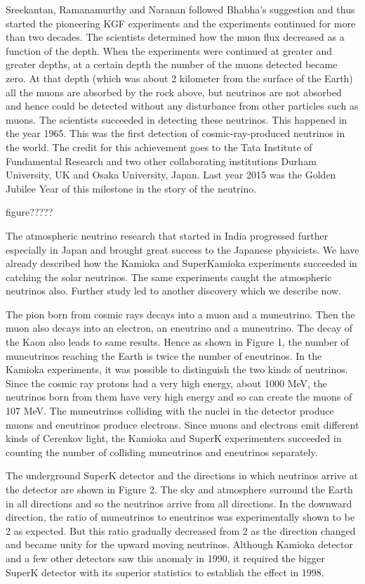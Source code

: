 Sreekantan, Ramanamurthy and Naranan followed Bhabha’s suggestion
and thus started the pioneering KGF experiments and the experiments continued for more than two decades. The scientists determined how the muon flux decreased as a function of the depth. When the experiments were continued at greater and greater depths, at a certain depth the number of the
muons detected became zero. At that depth (which was about 2 kilometer
from the surface of the Earth) all the muons are absorbed by the rock above,
but neutrinos are not absorbed and hence could be detected without any
disturbance from other particles such as muons. The scientists succeeded in
detecting these neutrinos. This happened in the year 1965. This was the
first detection of cosmic-ray-produced neutrinos in the world. The credit for
this achievement goes to the Tata Institute of Fundamental Research and
two other collaborating institutions Durham University, UK and Osaka University, Japan. Last year 2015 was the Golden Jubilee Year of this milestone
in the story of the neutrino.

figure?????
\newpage

The atmospheric neutrino research that started in India progressed further especially in Japan and brought great success to the Japanese physicists.
We have already described how the Kamioka and SuperKamioka experiments
succeeded in catching the solar neutrinos. The same experiments caught the
atmospheric neutrinos also. Further study led to another discovery which we
describe now.

The pion born from cosmic rays decays into a muon and a muneutrino.
Then the muon also decays into an electron, an eneutrino and a muneutrino.
The decay of the Kaon also leads to same results. Hence as shown in Figure 1, the number of muneutrinos reaching the Earth is twice the number
of eneutrinos. In the Kamioka experiments, it was possible to distinguish
the two kinds of neutrinos. Since the cosmic ray protons had a very high
energy, about 1000 MeV, the neutrinos born from them have very high energy and so can create the muons of 107 MeV. The muneutrinos colliding
with the nuclei in the detector produce muons and eneutrinos produce electrons. Since muons and electrons emit different kinds of Cerenkov light, the
Kamioka and SuperK experimenters succeeded in counting the number of
colliding muneutrinos and eneutrinos separately.

The underground SuperK detector and the directions in which neutrinos arrive at the detector are shown in Figure 2. The sky and atmosphere
surround the Earth in all directions and so the neutrinos arrive from all directions. In the downward direction, the ratio of muneutrinos to eneutrinos was
experimentally shown to be 2 as expected. But this ratio gradually decreased
from 2 as the direction changed and became unity for the upward moving
neutrinos. Although Kamioka detector and a few other detectors saw this
anomaly in 1990, it required the bigger SuperK detector with its superior
statistics to establish the effect in 1998.

